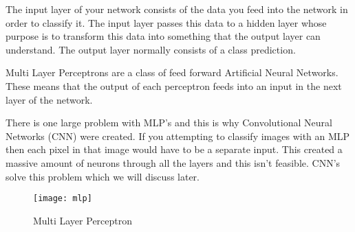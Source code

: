 The input layer of your network consists of the data you feed into the network
in order to classify it. The input layer passes this data to a hidden layer
whose purpose is to transform this data into something that the output layer can
understand. The output layer normally consists of a class prediction.

Multi Layer Perceptrons are a class of feed forward Artificial Neural Networks.
These means that the output of each perceptron feeds into an input in the next
layer of the network.

There is one large problem with MLP's and this is why Convolutional Neural
Networks (CNN) were created. If you attempting to classify images with an MLP then
each pixel in that image would have to be a separate input. This created a
massive amount of neurons through all the layers and this isn't feasible. CNN's
solve this problem which we will discuss later.

\begin{figure}
    \texttt{[image: mlp]}
     \caption{Multi Layer Perceptron}
     \label{fig:mlp}
\end{figure}


